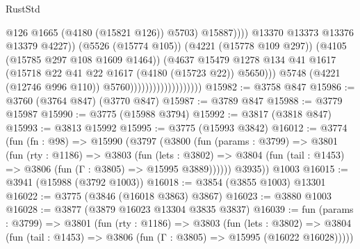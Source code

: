 \begin{lexlean}{RustStd}
\begin{coremodule}
{\begin{coremodule}
{{{{{{{{{{{{{{{{{{{{{{{{{{{{{{{                                                          @126
                                                          @1665
                                                          (@4180 (@15821 @126))
                                                          @5703)
                                                        @15887))))
                                                @13370
                                                @13373
                                                @13376
                                                @13379
                                                @4227))
                                            (@5526 (@15774 @105))
                                            (@4221 (@15778 @109 @297))
                                            (@4105 (@15785 @297 @108 @1609 @1464))
                                            (@4637
                                              @15479
                                              @1278
                                              @134
                                              @41
                                              @1617
                                              (@15718
                                                @22
                                                @41
                                                @22
                                                @1617
                                                (@4180 (@15723 @22))
                                                @5650)))
                                          @5748
                                          (@4221 (@12746 @996 @110))
                                          @5760)))))))))))))))))))
@15982 := @3758 @847
@15986 := @3760 (@3764 @847) (@3770 @847)
@15987 := @3789 @847
@15988 := @3779 @15987
@15990 := @3775 (@15988 @3794)
@15992 := @3817 (@3818 @847)
@15993 := @3813 @15992
@15995 := @3775 (@15993 @3842)
@16012 := @3774
    (fun (fn : @98) =>
    @15990
      (@3797
        (@3800
          (fun (params : @3799) =>
          @3801
            (fun (rty : @1186) =>
            @3803
              (fun (lets : @3802) =>
              @3804 (fun (tail : @1453) => @3806 (fun (Γ : @3805) => @15995 @3889))))))
        @3935))
    @1003
@16015 := @3941 (@15988 (@3792 @1003))
@16018 := @3854 (@3855 @1003) @13301
@16022 := @3775 (@3846 (@16018 @3863) @3867)
@16023 := @3880 @1003
@16028 := @3877 (@3879 @16023 @13304 @3835 @3837)
@16039 := fun (params : @3799) =>
  @3801
    (fun (rty : @1186) =>
    @3803
      (fun (lets : @3802) =>
      @3804 (fun (tail : @1453) => @3806 (fun (Γ : @3805) => @15995 (@16022 @16028)))))
}}}}}}}}}}}}}}}}}}}}}}}}}}}}}}}
\end{coremodule}}
\end{coremodule}
\end{lexlean}
